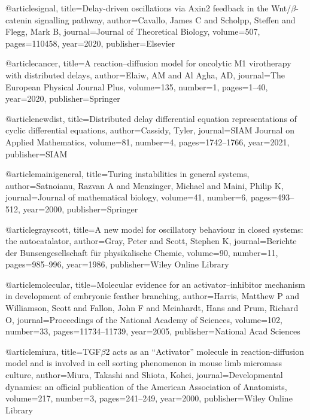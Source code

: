 @article{signal,
  title={Delay-driven oscillations via Axin2 feedback in the Wnt/$\beta$-catenin signalling pathway},
  author={Cavallo, James C and Scholpp, Steffen and Flegg, Mark B},
  journal={Journal of Theoretical Biology},
  volume={507},
  pages={110458},
  year={2020},
  publisher={Elsevier}
}

@article{cancer,
  title={A reaction--diffusion model for oncolytic M1 virotherapy with distributed delays},
  author={Elaiw, AM and Al Agha, AD},
  journal={The European Physical Journal Plus},
  volume={135},
  number={1},
  pages={1--40},
  year={2020},
  publisher={Springer}
}

@article{newdist,
  title={Distributed delay differential equation representations of cyclic differential equations},
  author={Cassidy, Tyler},
  journal={SIAM Journal on Applied Mathematics},
  volume={81},
  number={4},
  pages={1742--1766},
  year={2021},
  publisher={SIAM}
}

@article{mainigeneral,
  title={Turing instabilities in general systems},
  author={Satnoianu, Razvan A and Menzinger, Michael and Maini, Philip K},
  journal={Journal of mathematical biology},
  volume={41},
  number={6},
  pages={493--512},
  year={2000},
  publisher={Springer}
}

@article{grayscott,
  title={A new model for oscillatory behaviour in closed systems: the autocatalator},
  author={Gray, Peter and Scott, Stephen K},
  journal={Berichte der Bunsengesellschaft f{\"u}r physikalische Chemie},
  volume={90},
  number={11},
  pages={985--996},
  year={1986},
  publisher={Wiley Online Library}
}

@article{molecular,
  title={Molecular evidence for an activator--inhibitor mechanism in development of embryonic feather branching},
  author={Harris, Matthew P and Williamson, Scott and Fallon, John F and Meinhardt, Hans and Prum, Richard O},
  journal={Proceedings of the National Academy of Sciences},
  volume={102},
  number={33},
  pages={11734--11739},
  year={2005},
  publisher={National Acad Sciences}
}

@article{miura,
  title={TGF$\beta$2 acts as an “Activator” molecule in reaction-diffusion model and is involved in cell sorting phenomenon in mouse limb micromass culture},
  author={Miura, Takashi and Shiota, Kohei},
  journal={Developmental dynamics: an official publication of the American Association of Anatomists},
  volume={217},
  number={3},
  pages={241--249},
  year={2000},
  publisher={Wiley Online Library}
}

